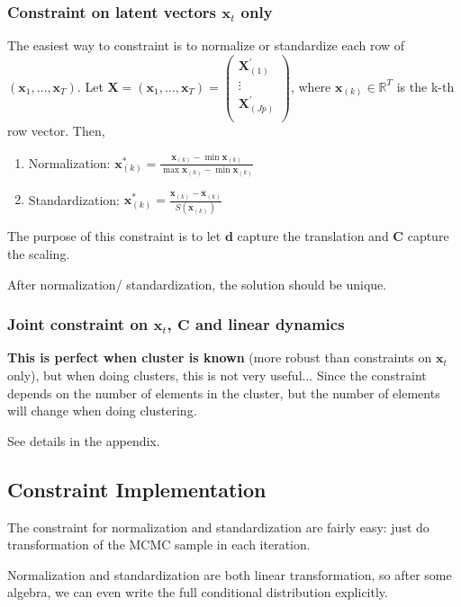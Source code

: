 \documentclass[]{article}
\begin{document}
\subsubsection{Constraint on latent vectors $\mathbf{x}_t$ only}
The easiest way to constraint is to normalize or standardize each row of \((\mathbf{x}_{1},\ldots,\mathbf{x}_{T})\). Let \(\mathbf{X} = \left( \mathbf{x}_{1},\ldots,\mathbf{x}_{T} \right) = \begin{pmatrix}
	\mathbf{X}_{(1)}^{'} \\
	\vdots \\
	\mathbf{X}_{(Jp)}^{'} \\
\end{pmatrix}\), where \(\mathbf{x}_{(k)} \in \mathbb{R}^{T}\) is the k-th row vector. Then,
\begin{enumerate}
	\def\labelenumi{(\arabic{enumi})}
	\item
	Normalization: \(\mathbf{x}_{(k)}^* = \frac{\mathbf{x}_{(k)}-\min \mathbf{x}_{(k)}}{\max \mathbf{x}_{(k)} - \min \mathbf{x}_{(k)}}\)
	\item
	Standardization: \(\mathbf{x}_{(k)}^* = \frac{\mathbf{x}_{(k)} - \bar{\mathbf{x}}_{(k)}}{S(\mathbf{x}_{(k)})}\)
\end{enumerate}
The purpose of this constraint is to let $\bm{d}$ capture the translation and $\bm{C}$ capture the scaling.

After normalization/ standardization, the solution should be unique.

\subsubsection{Joint constraint on $\mathbf{x}_t$, $\mathbf{C}$ and linear dynamics}

\textbf{This is perfect when cluster is known} (more robust than constraints on $\bm{x}_t$ only), but when doing clusters, this is not very useful... Since the constraint depends on the number of elements in the cluster, but the number of elements will change when doing clustering.

See details in the appendix.


\subsection{Constraint Implementation}
The constraint for normalization and standardization are fairly easy: just do transformation of the MCMC sample in each iteration.

Normalization and standardization are both linear transformation, so after some algebra, we can even write the full conditional distribution explicitly.
\end{document}
